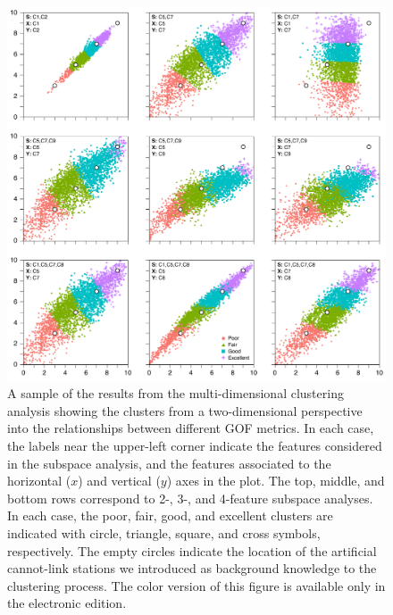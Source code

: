 \begin{figure}[ht!]
	\centering
	\includegraphics[width=\textwidth]{figures/pdf/figure-05}
	\caption{A sample of the results from the multi-dimensional clustering analysis showing the clusters from a two-dimensional perspective into the relationships between different GOF metrics. In each case, the labels near the upper-left corner indicate the features considered in the subspace analysis, and the features associated to the horizontal ($x$) and vertical ($y$) axes in the plot. The top, middle, and bottom rows correspond to 2-, 3-, and 4-feature subspace analyses. In each case, the poor, fair, good, and excellent clusters are indicated with circle, triangle, square, and cross symbols, respectively. The empty circles indicate the location of the artificial cannot-link stations we introduced as background knowledge to the clustering process. The color version of this figure is available only in the electronic edition.}
	\label{fig:clusters}
\end{figure}

